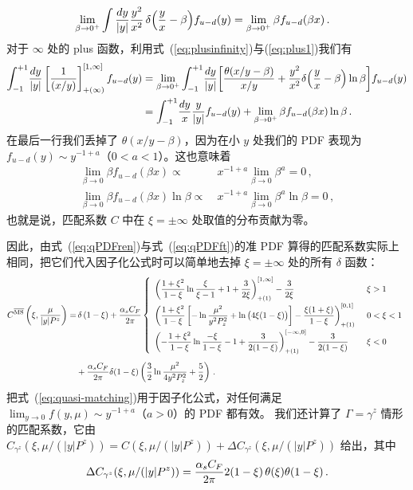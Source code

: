 \begin{widetext}
\begin{align}
&\lim_{\beta\to0^+}\int {dy\over |y|} {y^2\over x^2}
\, \delta\Big({y\over x} -\beta\Big) f_{u-d}(y)
=\lim_{\beta\to0^+}\beta f_{u-d}(\beta x)\,.
\end{align}
对于 $\infty$ 处的 plus 函数，利用式~(\ref{eq:plusinfinity})与(\ref{eq:plus1})我们有
\begin{align}
\int_{-1}^{+1}\! {dy\over |y|} \left[{1\over (x/y)}\right]_{+(\infty)}^{[1,\infty]} f_{u-d}(y)
&= \lim_{\beta\to 0^+} \int_{-1}^{+1}\! {dy\over |y|}
\bigg[  {\theta(x/y-\beta) \over x/y}
+ {y^2\over x^2}\delta\Bigl({y\over x} -\beta\Bigr)\ln\beta  \bigg] f_{u-d}(y)
\\
&= \int_{-1}^{+1}\! {dy\over x} {y\over |y|} f_{u-d}(y)
+ \lim_{\beta\to 0^+}\beta f_{u-d}(\beta x)\ln\beta
\,. \nonumber
\end{align}
在最后一行我们丢掉了 $\theta(x/y-\beta)$，因为在小 $y$ 处我们的 PDF 表现为 $f_{u-d}(y)\sim y^{-1+a}$（$0<a<1$）。这也意味着
\begin{align}
\lim_{\beta\to0}\beta f_{u-d}(\beta x) \propto\: & x^{-1+a}\lim_{\beta\to0} \beta^a  =0\,, \\
\lim_{\beta\to0}\beta f_{u-d}(\beta x)\ln\beta \propto\: & x^{-1+a}\lim_{\beta\to0} \beta^a \ln\beta =0\,,
\end{align}
也就是说，匹配系数 $C$ 中在 $\xi=\pm\infty$ 处取值的分布贡献为零。

因此，由式~(\ref{eq:qPDFren})与式~(\ref{eq:qPDFft})的准 PDF 算得的匹配系数实际上相同，把它们代入因子化公式时可以简单地去掉 $\xi=\pm\infty$ 处的所有 $\delta$ 函数：
\begin{align} \label{eq:quasi-matching}
C^{\overline{\rm MS}}\left(\xi, {\mu\over |y| P^z}\right)
= &\, \delta\left(1-\xi\right)+{\alpha_sC_F\over 2\pi}\left\{
\begin{array}{ll}
\displaystyle \left({1+\xi^2\over 1-\xi}\ln {\xi\over \xi-1} + 1 + {3\over 2\xi}\right)^{[1,\infty]}_{+(1)}- {3\over 2\xi}
&\, \xi>1
\\[10pt]
\displaystyle \left({1+\xi^2\over 1-\xi}\left[
- \ln{\mu^2\over y^2P_z^2} + \ln\big(4\xi(1-\xi)\big)\right] - {\xi(1+\xi)\over 1-\xi}\right)^{[0,1]}_{+(1)}
&\, 0<\xi<1
\\[10pt]
\displaystyle  \left(-{1+\xi^2\over 1-\xi}\ln {-\xi\over 1-\xi} - 1 + {3\over 2(1-\xi)}\right)^{[-\infty,0]}_{+(1)} - {3\over 2(1-\xi)}\quad
&\, \xi<0
\end{array}\right.\\[5pt]
& + {\alpha_sC_F\over 2\pi}\delta(1-\xi) \left( {3\over2}\ln{\mu^2\over 4y^2P_z^2} + {5\over2}\right)\,.\nonumber
\end{align}
把式~(\ref{eq:quasi-matching})用于因子化公式，对任何满足 $\lim_{y\to 0} f(y,\mu) \sim y^{-1+a}$（$a>0$）的 PDF 都有效。
我们还计算了 $\Gamma=\gamma^z$ 情形的匹配系数，它由 $C_{\gamma^z}(\xi, \mu/(|y| P^z)) = C(\xi, \mu/(|y| P^z)) + \Delta C_{\gamma^z}(\xi, \mu/(|y| P^z))$ 给出，其中
\begin{align}
\Delta C_{\gamma^z}(\xi, \mu/(|y| P^z))  = {\alpha_s C_F\over 2\pi} 2(1-\xi)
  \,\theta(\xi)\theta(1-\xi) \,.
\end{align}


\end{widetext}
